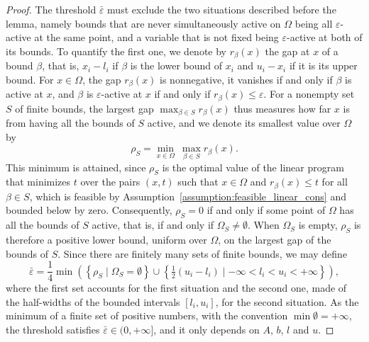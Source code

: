 \documentclass{article}
\numberwithin{equation}{section}
\theoremstyle{plain}
\begin{document}
\begin{proof}
	The threshold $\bar\varepsilon$ must exclude the two situations described before the lemma, namely bounds that are never simultaneously active on $\Omega$ being all $\varepsilon$-active at the same point, and a variable that is not fixed being $\varepsilon$-active at both of its bounds. To quantify the first one, we denote by $r_\beta(x)$ the gap at $x$ of a bound $\beta$, that is, $x_i - l_i$ if $\beta$ is the lower bound of $x_i$ and $u_i - x_i$ if it is its upper bound. For $x \in \Omega$, the gap $r_\beta(x)$ is nonnegative, it vanishes if and only if $\beta$ is active at $x$, and $\beta$ is $\varepsilon$-active at $x$ if and only if $r_\beta(x) \le \varepsilon$. For a nonempty set $S$ of finite bounds, the largest gap $\max_{\beta\in S} r_\beta(x)$ thus measures how far $x$ is from having all the bounds of $S$ active, and we denote its smallest value over $\Omega$ by
	\[\rho_S = \min_{x\in\Omega}\ \max_{\beta\in S} r_\beta(x).\]
	This minimum is attained, since $\rho_S$ is the optimal value of the linear program that minimizes $t$ over the pairs $(x,t)$ such that $x \in \Omega$ and $r_\beta(x) \le t$ for all $\beta \in S$, which is feasible by Assumption~\ref{assumption:feasible_linear_cons} and bounded below by zero. Consequently, $\rho_S = 0$ if and only if some point of $\Omega$ has all the bounds of $S$ active, that is, if and only if $\Omega_S \ne \emptyset$. When $\Omega_S$ is empty, $\rho_S$ is therefore a positive lower bound, uniform over $\Omega$, on the largest gap of the bounds of $S$. Since there are finitely many sets of finite bounds, we may define
	\[\bar\varepsilon = \frac{1}{4}\min\left(\left\{\rho_S \mid \Omega_S = \emptyset\right\} \cup \left\{\tfrac{1}{2}(u_i-l_i) \mid -\infty < l_i < u_i < +\infty\right\}\right),\]
	where the first set accounts for the first situation and the second one, made of the half-widths of the bounded intervals $[l_i,u_i]$, for the second situation. As the minimum of a finite set of positive numbers, with the convention $\min\emptyset = +\infty$, the threshold satisfies $\bar\varepsilon \in (0,+\infty]$, and it only depends on $A$, $b$, $l$ and $u$.


\end{proof}
\end{document}
